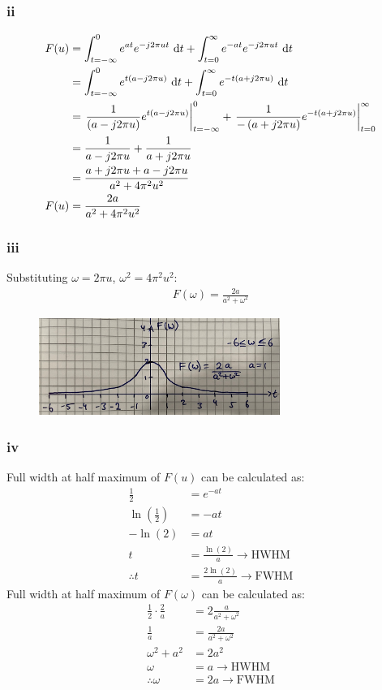 \documentclass[11pt]{article}
\numberwithin{equation}{section}
\begin{document}
\subsubsection*{ii}
\begin{align}
	F(u) &= \int_{t=-\infty}^{0}e^{at}e^{-j2\pi u t}  \,\dif t + \int_{t=0}^{\infty} e^{-at} e^{-j2\pi u t}\,\dif t\\
	&= \int_{t=-\infty}^{0}e^{t(a - j2\pi u)}  \,\dif t + \int_{t=0}^{\infty} e^{-t(a + j2\pi u)}\,\dif t\\
	&= \left. \frac{1}{\left(a - j2\pi u\right)}e^{t\left(a - j2\pi u\right)} \right|_{t = -\infty}^0 + \left. \frac{1}{-\left(a + j2\pi u\right)}e^{-t\left(a + j2\pi u\right)} \right|_{t=0}^\infty\\
	&= \frac{1}{a - j2\pi u} + \frac{1}{a + j2\pi u}\\
	&= \frac{a + j2\pi u + a - j2\pi u}{a^2 + 4\pi^2 u^2}\\
	F(u) &= \frac{2a}{a^2 + 4\pi^2u^2}
\end{align}
\subsubsection*{iii}
Substituting $\omega = 2\pi u$, $\omega^2 = 4\pi^2 u^2$:
\begin{align}
	F(\omega) = \frac{2a}{a^2 + \omega^2}
\end{align}
\begin{figure}[H]
	\centering
	\includegraphics[width = 0.7\textwidth]{./img/q1eiii.JPG}
	\caption{}
\end{figure}
\subsubsection*{iv}
Full width at half maximum of $F\left(u\right)$ can be calculated as:
\begin{align}
	\frac{1}{2} &= e^{-at}\\
	\ln \left(\frac{1}{2}\right) &= -at\\
	-\ln \left(2\right) &= at\\
	t &= \frac{\ln \left( 2 \right)}{a} \rightarrow \textrm{HWHM}\\
	\therefore t &= \frac{2\ln \left( 2 \right)}{a} \rightarrow \textrm{FWHM}
\end{align}
Full width at half maximum of $F\left(\omega\right)$ can be calculated as:
\begin{align}
	\frac{1}{2}\cdot\frac{2}{a} &= 2\frac{a}{a^2 + \omega^2}\\
	\frac{1}{a} &= \frac{2a}{a^2 + \omega^2}\\
	\omega^2 + a^2 &= 2a^2\\
	\omega &= a \rightarrow \textrm{HWHM}\\
	\therefore \omega &= 2a \rightarrow \textrm{FWHM}
\end{align}
\end{document}
